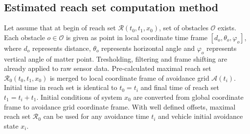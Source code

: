 \subsection{Estimated reach set computation method}\label{ch:estimatedReachSetMethod}
\noindent Let assume that at begin of reach set $\mathscr{R}(t_0,t_1,x_0)$, set of obstacles $\mathscr{O}$ exists. Each obstacle $o\in\mathscr{O}$ is given as point in local coordinate time frame $[d_o,\theta_o,\varphi_o]$, where $d_o$ represents distance, $\theta_o$ represents horizontal angle and $\varphi_o$ represents vertical angle of matter point. Tresholding, filtering and frame shifting are already applied to raw sensor data. Pre-calculated maximal reach set $\mathscr{R}_0(t_0,t_1,x_0)$ is merged to local coordinate frame of avoidance grid $\mathscr{A}(t_i)$. Initial time in reach set is identical to $t_0=t_i$ and final time of reach set $t_1=t_i+t_1$. Initial conditions of system $x_0$ are converted from global coordinate frame to avoidance grid coordinate frame. With well defined offsets, maximal reach set $\mathscr{R}_0$ can be used for any avoidance time $t_i$ and vehicle initial avoidance state $x_i$.

